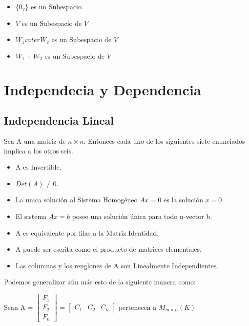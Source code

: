 \documentclass[12pt]{report}                                %
\begin{document}
        \begin{itemize}
            \item \{$0_v$\} es un Subespacio.

            \item $V$ es un Subespacio de $V$

            \item $W_1 inter W_2$ es un Subespacio de $V$

            \item $W_1 + W_2$ es un Subespacio de $V$
        \end{itemize}


    \clearpage
    \section{Independecia y Dependencia}   

        \subsection{Independencia Lineal}
        Sea A una matriz de $n \times n$. Entonces cada uno de los siguientes siete enunciados implica a los otros seis.
        \begin{itemize}
            \item A es Invertible.
            \item $Det(A) \neq 0$.
            \item La unica solución al Sistema Homogéneo $Ax=0$ es la solución $x=0$.
            \item El sistema $Ax=b$ posee una solución única para todo n-vector b.
            \item A es equivalente por filas a la Matriz Identidad.
            \item A puede ser escrita como el producto de matrices elementales.
            \item Las columnas y los renglones de A son Linealmente Independientes.
        \end{itemize}

        Podemos generalizar aún más esto de la siguiente manera como: 

        Sean A  = $\begin{bmatrix} F_{1} \\ F_{2} \\ F_{n} \end{bmatrix} $ 
                = $\begin{bmatrix} C_{1} &  C_{2} &  C_{n} \end{bmatrix} $
                pertenecen a $M_{m\times n} (K)$
\end{document}
